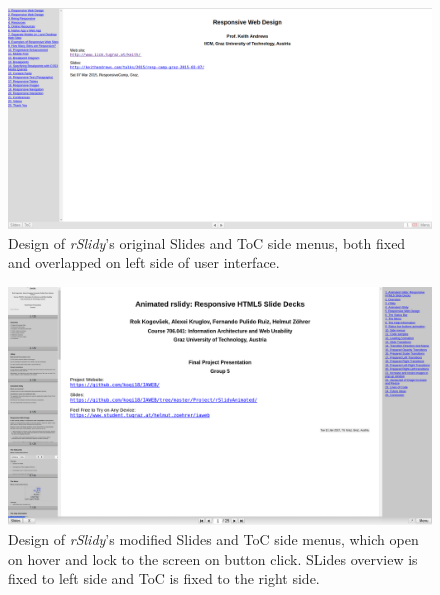 \begin{figure}[tp]
	\centering
	\includegraphics[width = .9\textwidth]{images/tocOld.png}
	
	\caption[Original Side Menus]{
		Design of \textit{rSlidy}'s original Slides and ToC side menus, 
both fixed and overlapped on left side of user interface.
	}
	\label{fig:sideOLD}
\end{figure}
\begin{figure}[tp]
	\centering
	\includegraphics[width = .9\textwidth]{images/sidemenus.png}
	
	\caption[Modified Side Menus]{
		Design of \textit{rSlidy}'s modified Slides and ToC side menus, 
which open on hover and lock to the screen on button click. SLides overview is 
fixed to left side and ToC is fixed to the right side.
	}
	\label{fig:sideNEW}
\end{figure}

